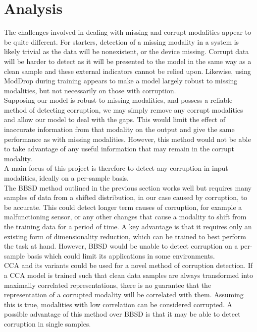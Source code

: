 \chapter{Analysis}
\label{chapter:analysis}
The challenges involved in dealing with missing and corrupt modalities appear to be quite different. For starters, detection of a missing modality in a system is likely trivial as the data will be nonexistent, or the device missing. Corrupt data will be harder to detect as it will be presented to the model in the same way as a clean sample and these external indicators cannot be relied upon. Likewise, using ModDrop \cite{ModDrop} during training appears to make a model largely robust to missing modalities, but not necessarily on those with corruption.\\

Supposing our model is robust to missing modalities, and possess a reliable method of detecting corruption, we may simply remove any corrupt modalities and allow our model to deal with the gaps. This would limit the effect of inaccurate information from that modality on the output and give the same performance as with missing modalities. However, this method would not be able to take advantage of any useful information that may remain in the corrupt modality.\\

A main focus of this project is therefore to detect any corruption in input modalities, ideally on a per-sample basis.\\

The BBSD method outlined in the previous section works well but requires many samples of data from a shifted distribution, in our case caused by corruption, to be accurate. This could detect longer term causes of corruption, for example a malfunctioning sensor, or any other changes that cause a modality to shift from the training data for a period of time. A key advantage is that it requires only an existing form of dimensionality reduction, which can be trained to best perform the task at hand. However, BBSD would be unable to detect corruption on a per-sample basis which could limit its applications in some environments.\\

CCA and its variants could be used for a novel method of corruption detection. If a CCA model is trained such that clean data samples are always transformed into maximally correlated representations, there is no guarantee that the representation of a corrupted modality will be correlated with them. Assuming this is true, modalities with low correlation can be considered corrupted. A possible advantage of this method over BBSD is that it may be able to detect corruption in single samples.\\


